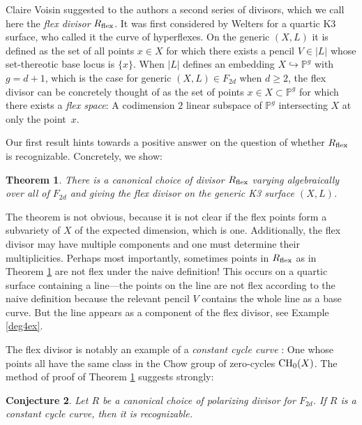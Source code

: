 \documentclass{amsart}
\newtheorem{theorem}{Theorem}[section]
\newtheorem{conjecture}[theorem]{Conjecture}
\theoremstyle{definition}
\begin{document}
Claire Voisin suggested to the authors a second series of divisors, which we call
here the {\it flex divisor} $R_{\rm flex}$. It was first considered by Welters
\cite{welters1981abel} for a quartic K3 surface, who called it the
curve of hyperflexes.
On the generic $(X,L)$ it is defined as the
set of all points $x\in X$ for which there exists a pencil $V\in |L|$ whose set-thereotic
base locus is $\{x\}$.
When $|L|$ defines an embedding $X\hookrightarrow \mathbb{P}^g$ with $g=d+1$,
which is the case for generic $(X,L)\in F_{2d}$ when $d\geq 2$, the flex divisor can be concretely thought
of as the set of points $x\in X\subset \mathbb{P}^g$ for which there exists a {\it flex space}: A codimension
$2$ linear subspace of $\mathbb{P}^g$ intersecting $X$ at only the point~$x$.

Our first result hints towards a positive answer on the question of whether $R_{\rm flex}$ is recognizable.
Concretely, we show:

\begin{theorem}\label{flex-exists} There is a canonical choice of divisor $R_{\rm flex}$ 
varying algebraically over all of $F_{2d}$ and giving the flex divisor on the
generic K3 surface $(X,L)$. \end{theorem}

The theorem is not obvious, because it is not clear if the
flex points form a subvariety of $X$ of the expected dimension, which is one.
Additionally, the flex divisor may have multiple components and
 one must determine their multiplicities. Perhaps most importantly,
sometimes points in $R_{\rm flex}$ as in Theorem \ref{flex-exists}
are not flex under the naive definition!
This occurs on a quartic surface containing a line---the points on the line are not
flex according to the naive definition because the relevant pencil $V$ contains the whole line as a base
curve. But the line appears as a component of the flex divisor, see Example \ref{deg4ex}.

The flex divisor is notably an example of a {\it constant cycle curve}
\cite{huybrechts2013curves}:
One whose points all have the same
class in the Chow group of zero-cycles ${\rm CH}_0(X)$. The method of proof of
Theorem \ref{flex-exists} suggests strongly:

\begin{conjecture} Let $R$ be a canonical choice of polarizing divisor for $F_{2d}$. If $R$
is a constant cycle curve, then it is recognizable. \end{conjecture}
\end{document}
